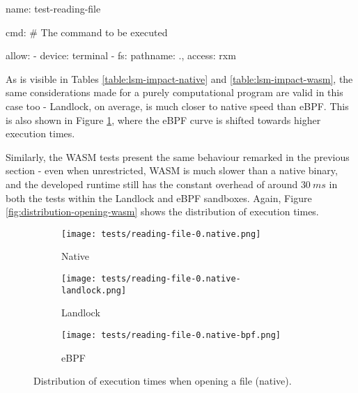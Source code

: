 \vspace*{0.5cm}
\begin{code}[language=yaml, caption=The outline of the policy used for testing the reading program., label=lst:outline-policy-reading-test]
name: test-reading-file

cmd: # The command to be executed

allow:
  - device: terminal
  - fs: {pathname: ., access: rxm}
\end{code}

As is visible in Tables \ref{table:lsm-impact-native} and \ref{table:lsm-impact-wasm},
the same considerations made for a purely computational program are valid in this case too
- Landlock, on average, is much closer to native speed than eBPF.
This is also shown in Figure \ref{fig:distribution-opening-native}, where the eBPF curve is shifted towards
higher execution times.

Similarly, the WASM tests present the same behaviour remarked in the previous section -
even when unrestricted, WASM is much slower than a native binary, and the developed runtime
still has the constant overhead of around $30\ ms$ in both the tests within the Landlock and eBPF sandboxes.
Again, Figure \ref{fig:distribution-opening-wasm} shows the distribution of execution times.

\begin{figure}[ht]
  \centering
  \begin{subfigure}[b]{0.32\textwidth}
    \centering
    \texttt{[image: tests/reading-file-0.native.png]}
    \caption{Native}
  \end{subfigure}
  \begin{subfigure}[b]{0.32\textwidth}
    \centering
    \texttt{[image: tests/reading-file-0.native-landlock.png]}
    \caption{Landlock}
  \end{subfigure}
  \begin{subfigure}[b]{0.32\textwidth}
    \centering
    \texttt{[image: tests/reading-file-0.native-bpf.png]}
    \caption{eBPF}
  \end{subfigure}
  \caption{Distribution of execution times when opening a file (native).}
  \label{fig:distribution-opening-native}
\end{figure}

